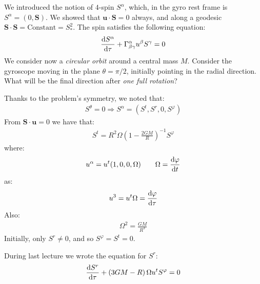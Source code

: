 \documentclass[../template.tex]{subfiles}
\begin{document}
\section{}

We introduced the notion of $4$-spin $S^\alpha$, which, in the gyro rest frame is $S^\alpha =(0, \bm{S})$. We showed that $\bm{u}\cdot \bm{S} = 0$ always, and along a geodesic $\bm{S}\cdot \bm{S} = \text{Constant} = S_*^2$. The spin satisfies the following equation:
\begin{align*}
    \dv{S^\alpha}{\tau} + \Gamma^\alpha_{\beta \gamma} u^\beta S^\gamma = 0
\end{align*}   
We consider now a \textit{circular orbit} around a central mass $M$. Consider the gyroscope moving in the plane $\theta = \pi/2$, initially pointing in the radial direction. What will be the final direction after \textit{one full rotation}?

Thanks to the problem's symmetry, we noted that:
\begin{align*}
    S^\theta = 0 \Rightarrow S^\alpha = (S^t, S^r, 0, S^\varphi)
\end{align*}
From $\bm{S}\cdot \bm{u} = 0$ we have that:
\begin{align*}
    S^t = R^2 \Omega \left(1-\frac{2GM}{R} \right)^{-1} S^\varphi
\end{align*} 
where:
\begin{align*}
    u^\alpha = u^t(1,0,0,\Omega) \qquad \Omega = \dv{\varphi}{t}
\end{align*}
as:
\begin{align*}
    u^3 = u^t \Omega = \dv{\varphi}{\tau}
\end{align*}
Also:
\begin{align*}
    \Omega^2 = \frac{GM}{R^3} 
\end{align*}
Initially, only $S^r \neq 0$, and so $S^\varphi = S^t = 0$.

During last lecture we wrote the equation for $S^r$:
\begin{align*}
    \dv{S^r}{\tau} + \left(3GM - R\right) \Omega u^t S^\varphi = 0
\end{align*} 
\end{document}
